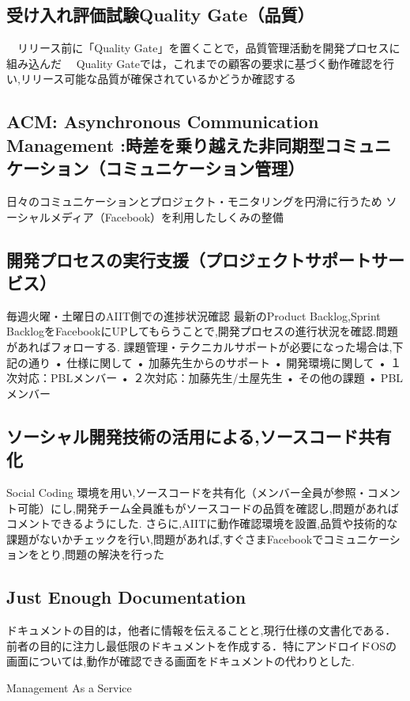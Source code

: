 \documentclass[paper]{jrsj}
\begin{document}
\subsection{受け入れ評価試験Quality Gate（品質）}
　リリース前に「Quality Gate」を置くことで，品質管理活動を開発プロセスに組み込んだ
　Quality Gateでは，これまでの顧客の要求に基づく動作確認を行い,リリース可能な品質が確保されているかどうか確認する

\subsection{ACM: Asynchronous Communication Management :時差を乗り越えた非同期型コミュニケーション（コミュニケーション管理）}
日々のコミュニケーションとプロジェクト・モニタリングを円滑に行うため
ソーシャルメディア（Facebook）を利用したしくみの整備

\subsection{開発プロセスの実行支援（プロジェクトサポートサービス）}
毎週火曜・土曜日のAIIT側での進捗状況確認
最新のProduct Backlog,Sprint BacklogをFacebookにUPしてもらうことで,開発プロセスの進行状況を確認.問題があればフォローする.
課題管理・テクニカルサポートが必要になった場合は,下記の通り
•	仕様に関して
•	加藤先生からのサポート
•	開発環境に関して
•	１次対応：PBLメンバー
•	２次対応：加藤先生/土屋先生
•	その他の課題
•	PBLメンバー

\subsection{ソーシャル開発技術の活用による,ソースコード共有化}
Social Coding 環境を用い,ソースコードを共有化（メンバー全員が参照・コメント可能）にし,開発チーム全員誰もがソースコードの品質を確認し,問題があればコメントできるようにした.
さらに,AIITに動作確認環境を設置,品質や技術的な課題がないかチェックを行い,問題があれば,すぐさまFacebookでコミュニケーションをとり,問題の解決を行った

\subsection{Just Enough Documentation}
ドキュメントの目的は，他者に情報を伝えることと,現行仕様の文書化である．前者の目的に注力し最低限のドキュメントを作成する．特にアンドロイドOSの画面については,動作が確認できる画面をドキュメントの代わりとした.

Management As a Service
 
\end{document}
